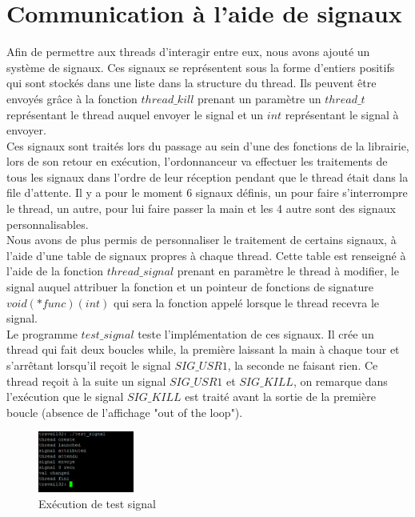 \section{Communication à l'aide de signaux}
	Afin de permettre aux threads d'interagir entre eux, nous avons ajouté un système de signaux.
	Ces signaux se représentent sous la forme d'entiers positifs qui sont stockés dans une liste dans la structure du thread. Ils peuvent être envoyés grâce à la fonction $thread\_kill$ prenant un paramètre un $thread\_t$ représentant le thread auquel envoyer le signal et un $int$ représentant le signal à envoyer.\\
	
	Ces signaux sont traités lors du passage au sein d'une des fonctions de la librairie, lors de son retour en exécution, l'ordonnanceur va effectuer les traitements de tous les signaux dans l'ordre de leur réception pendant que le thread était dans la file d'attente. Il y a pour le moment 6 signaux définis, un pour faire s'interrompre le thread, un autre, pour lui faire passer la main et les 4 autre sont des signaux personnalisables.\\
	
	Nous avons de plus permis de personnaliser le traitement de certains signaux, à l'aide d'une table de signaux propres à chaque thread. Cette table est renseigné à l'aide de la fonction $thread\_signal$ prenant en paramètre le thread à modifier, le signal auquel attribuer la fonction et un pointeur de fonctions de signature $void(*func)(int)$ qui sera la fonction appelé lorsque le thread recevra le signal.\\
	
	Le programme $test\_signal$ teste l'implémentation de ces signaux. Il crée un thread qui fait deux boucles while, la première laissant la main à chaque tour et s'arrêtant lorsqu'il reçoit le signal $SIG\_USR1$, la seconde ne faisant rien. Ce thread reçoit à la suite un signal $SIG\_USR1$ et $SIG\_KILL$, on remarque dans l'exécution que le signal $SIG\_KILL$ est traité avant la sortie de la première boucle (absence de l'affichage "out of the loop").\\
	
	
\begin{figure}[h]
  \begin{minipage}[c]{.45\linewidth}
    \begin{center}
      \includegraphics[height=2cm]{test_signal.png}
      \caption{Ex\'ecution de test signal}
      \label{test signal}
    \end{center}
  \end{minipage}
\end{figure}


